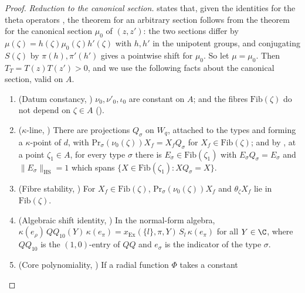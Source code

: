 \begin{proof}
\emph{Reduction to the canonical section.} 
states that, given the identities for the theta operators
, the theorem for an arbitrary section follows from
the theorem for the canonical section $\mu_0$ of $(z,z')$: the two sections differ by $\mu(\zeta)=h(\zeta)\mu_0(\zeta)h'(\zeta)$
with $h,h'$ in the unipotent groups, and conjugating $S(\zeta)$ by $\pi(h),\pi'(h')$ gives a pointwise shift for $\mu_0$. So
let $\mu=\mu_0$. Then $T_T=T(z)T(z')>0$, and we use the following facts about the canonical section, valid on $A$.
\begin{enumerate}[label=(\alph*)]
\item (Datum constancy, ) $\nu_0,\nu'_0,
  \iota_0$ are constant on $A$; and the fibres $\mathrm{Fib}(\zeta)$ do not depend on $\zeta\in A$
  ().
\item ($\kappa$-line, ) There are projections
  $Q_\sigma$ on $W_q$, attached to the types and forming a $\kappa$-point of $d$, with $\mathrm{Pr}_\sigma(\nu_0(\zeta))X_f=
  X_fQ_\sigma$ for $X_f\in\mathrm{Fib}(\zeta)$; and by ,
  at a point $\zeta_1\in A$, for every type $\sigma$ there is $E_\sigma\in\mathrm{Fib}(\zeta_1)$ with $E_\sigma Q_\sigma=
  E_\sigma$ and $\|E_\sigma\|_{\mathrm{HS}}=1$ which spans $\{X\in\mathrm{Fib}(\zeta_1):XQ_\sigma=X\}$.
\item (Fibre stability, ) For
  $X_f\in\mathrm{Fib}(\zeta)$, $\mathrm{Pr}_\sigma(\nu_0(\zeta))X_f$ and $\theta_\zeta X_f$ lie in $\mathrm{Fib}(\zeta)$.
\item (Algebraic shift identity,
  ) In the normal-form algebra,
  $\kappa(e_\rho)\,QQ_{10}(Y)\,\kappa(e_\pi)=x_{\mathrm{Ex}}(\{l\},\pi,Y)\,S_l\,\kappa(e_\pi)$ for all $Y\in\C$, where
  $QQ_{10}$ is the $(1,0)$-entry of $QQ$ and $e_\sigma$ is the indicator of the type $\sigma$.
\item (Core polynomiality,
  ) If a radial function $\Phi$ takes a constant

\end{enumerate}
\end{proof}
